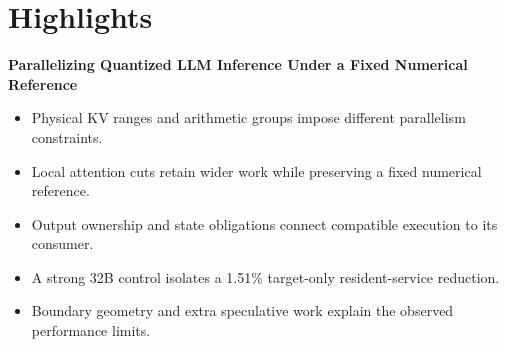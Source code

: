 \documentclass[11pt]{article}
\begin{document}
\section*{Highlights}
\noindent\textbf{Parallelizing Quantized LLM Inference Under a Fixed Numerical Reference}
\begin{itemize}
\item Physical KV ranges and arithmetic groups impose different parallelism constraints.
\item Local attention cuts retain wider work while preserving a fixed numerical reference.
\item Output ownership and state obligations connect compatible execution to its consumer.
\item A strong 32B control isolates a 1.51\% target-only resident-service reduction.
\item Boundary geometry and extra speculative work explain the observed performance limits.
\end{itemize}
\end{document}
